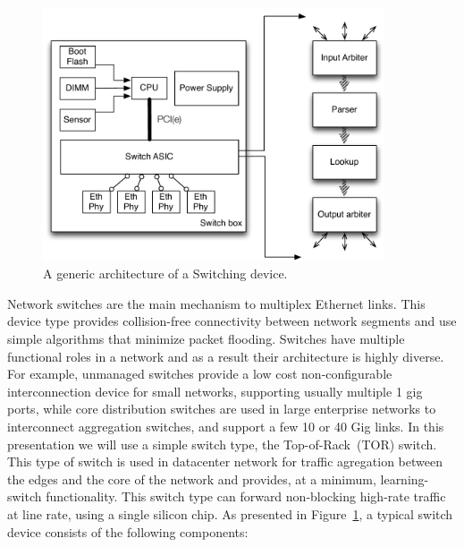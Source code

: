\begin{figure}
\includegraphics[width=0.9\textwidth]{switch_design}
\caption{A generic architecture of a Switching device.}
\label{fig:background:switch_design}
\end{figure}

Network switches are the main mechanism to multiplex Ethernet links.  This
device type provides collision-free connectivity between network segments and
use simple algorithms that minimize packet flooding.  Switches have multiple
functional roles in a network and as a result their architecture is highly
diverse. For
example, unmanaged switches provide a low cost non-configurable interconnection device 
for small networks, supporting usually multiple
1 gig ports, while core distribution switches are used in large enterprise
networks to interconnect aggregation switches, and support a few 10 or 40 Gig
links.  In this presentation we will use a simple switch type, the
Top-of-Rack~(TOR) switch.  This type of switch is used in datacenter network for
traffic agregation between the edges and the core of the network and provides,
at a minimum, learning-switch functionality. This switch type can forward
non-blocking high-rate traffic at line rate, using a single silicon chip. 
As presented in Figure~\ref{fig:background:switch_design}, a typical switch
device consists of the following components:

